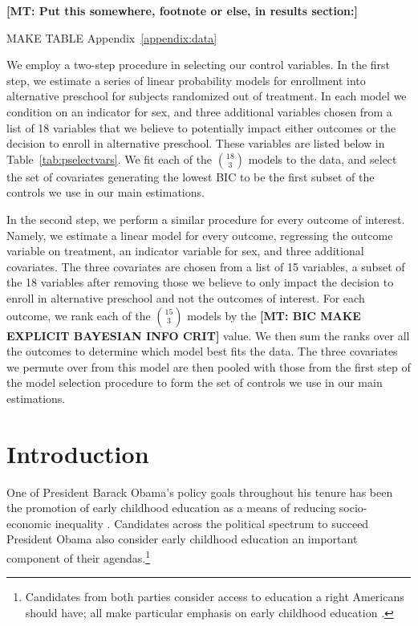 \singlespacing
\tableofcontents
\listoffigures
\listoftables


\textbf{[MT: Put this somewhere, footnote or else, in results section:]}

MAKE TABLE Appendix~\ref{appendix:data}

We employ a two-step procedure in selecting our control variables. In the first step, we estimate a series of linear probability models for enrollment into alternative preschool for subjects randomized out of treatment. In each model we condition on an indicator for sex, and three additional variables chosen from a list of 18 variables that we believe to potentially impact either outcomes or the decision to enroll in alternative preschool. These variables are listed below in Table~\ref{tab:pselectvars}.  We fit each of the $18 \choose 3$ models to the data, and select the set of covariates generating the lowest BIC to be the first subset of the controls we use in our main estimations.

In the second step, we perform a similar procedure for every outcome of interest. Namely, we estimate a linear model for every outcome, regressing the outcome variable on treatment, an indicator variable for sex, and three additional covariates. The three covariates are chosen from a list of 15 variables, a subset of the 18 variables after removing those we believe to only impact the decision to enroll in alternative preschool and not the outcomes of interest. For each outcome, we rank each of the $15 \choose 3$ models by the \textbf{[MT: BIC MAKE EXPLICIT BAYESIAN INFO CRIT]} value. We then sum the ranks over all the outcomes to determine which model best fits the data. The three covariates we permute over from this model are then pooled with those from the first step of the model selection procedure to form the set of controls we use in our main estimations.




\section{Introduction}

\noindent One of President Barack Obama's policy goals throughout his tenure has been the promotion of early childhood education as a means of reducing socio-economic inequality \citep{Bajaj_Labaton_2009_ObamaRiskAssets,White_House_2014_Econ_of_EC_Investments,White_House_2014_Fact_Sheet_Press}. Candidates across the political spectrum to succeed President Obama also consider early childhood education an important component of their agendas.\footnote{Candidates from both parties consider access to education a right Americans should have; all make particular emphasis on early childhood education \citep{Hillary-for-Am_2016_Universal-Preschool,On-the-Issues_2016_Sanders-on-Families,On-the-Issues_2016_Cruz-on-Education}.}\\ 

